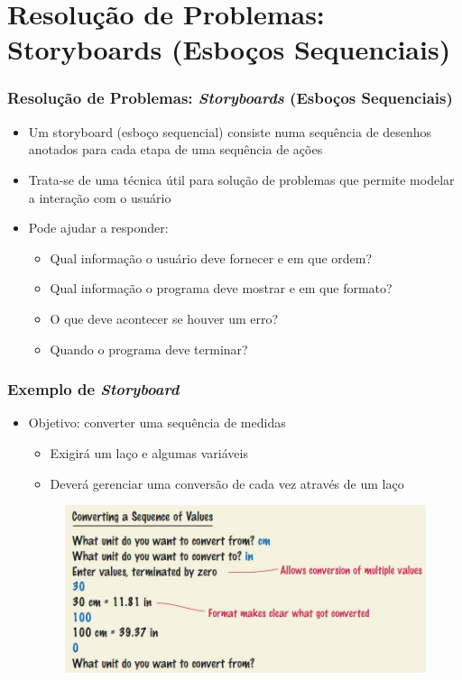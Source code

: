 \documentclass[xcolor={dvipsnames,table},aspectratio=169]{beamer}
\begin{document}
\section{Resolução de Problemas: Storyboards (Esboços Sequenciais)}

\begin{frame}\frametitle{Resolução de Problemas: \emph{Storyboards} (Esboços Sequenciais)}
\begin{itemize}
	\item Um storyboard (esboço sequencial) consiste numa sequência de desenhos anotados para cada etapa de uma sequência de ações
	\item Trata-se de uma técnica útil para solução de problemas que permite modelar a interação com o usuário
	\item Pode ajudar a responder:
	\begin{itemize}
		\item Qual informação o usuário deve fornecer e em que ordem?
		\item Qual informação o programa deve mostrar e em que formato?
		\item O que deve acontecer se houver um erro?
		\item Quando o programa deve terminar?
	\end{itemize}
\end{itemize}
\end{frame}

\begin{frame}\frametitle{Exemplo de \emph{Storyboard}}
\begin{itemize}
	\item Objetivo: converter uma sequência de medidas
	\begin{itemize}
		\item Exigirá um laço e algumas variáveis
		\item Deverá gerenciar uma conversão de cada vez através de um laço
	\end{itemize}
\begin{figure}[h]
	\includegraphics[height=0.5\paperheight,center]{pucrs-ep-fprog-unidade_04-lacos-laminas-storyboards1.jpg}
\end{figure}
\end{itemize}
\end{frame}
\end{document}
